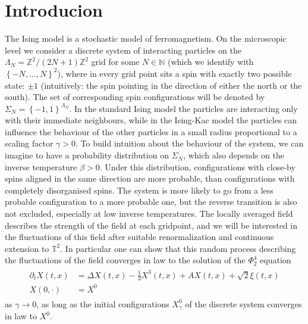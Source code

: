 \documentclass{report}
\newcommand{\ZZ}{\mathbb{Z}}
\newcommand{\NN}{\mathbb{N}}
\newcommand{\TT}{\mathbb{T}}
\theoremstyle{remark}
\theoremstyle{definition}
\begin{document}
\chapter{Introducion}
The Ising model is a stochastic model of ferromagnetism. On the microscopic level we consider a discrete system of interacting particles on the $\Lambda_N = \ZZ^2 / (2N+1)\ZZ^2$ grid for some $N \in \NN$ (which we identify with $\left\{-N, \dots, N\right\}^2$), where in every grid point sits a spin with exactly two possible state: $\pm1$ (intuitively: the spin pointing in the direction of either the north or the south). The set of corresponding spin configurations will be denoted by $\Sigma_N = \left\{-1, 1\right\}^{\Lambda_N}$. In the standard Ising model the particles are interacting only with their immediate neighbours, while in the Ising-Kac model the particles can influence the behaviour of the other particles in a small radius proportional to a scaling factor $\gamma > 0$. To build intuition about the behaviour of the system, we can imagine to have a probability distribution on $\Sigma_N$, which also depends on the inverse temperature $\beta > 0$. Under this distribution, configurations with close-by spins aligned in the same direction are more probable, than configurations with completely disorganised spins. The system is more likely to go from a less probable configuration to a more probable one, but the reverse transition is also not excluded, especially at low inverse temperatures. The locally averaged field describes the strength of the field at each gridpoint, and we will be interested in the fluctuations of this field after suitable renormalization and continuous extension to $\TT^2$. In particular one can show that this random process describing the fluctuations of the field converges in law to the solution of the $\Phi^4_2$ equation 
\begin{align}
  \label{eq:phi_4_2}
  \begin{split}
  \partial_t X(t, x) &= \Delta X(t, x) - \frac{1}{3}X^3(t, x) + A X(t, x) + \sqrt{2}\xi(t, x)\\
  X(0, \cdot) &= X^0\,    
  \end{split}
\end{align}
as $\gamma \to 0$, as long as the initial configurations $X_\gamma^0$ of the discrete system converges in law to $X^0$.
\end{document}
